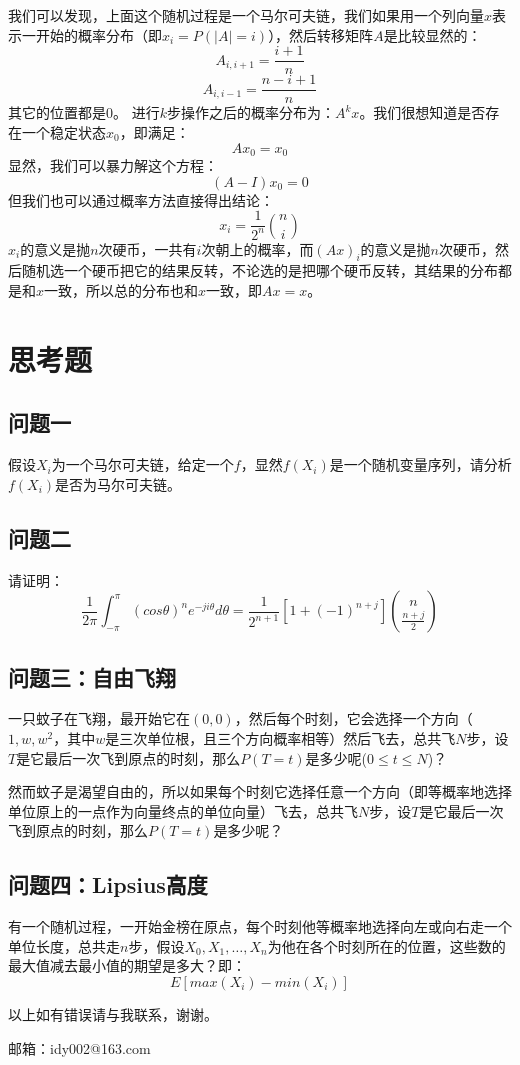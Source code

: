 		我们可以发现，上面这个随机过程是一个马尔可夫链，我们如果用一个列向量$x$表示一开始的概率分布（即$x_i = P(\lvert A\rvert=i)$），然后转移矩阵$A$是比较显然的：
		$$
			A_{i,i+1} = \frac{i+1}{n}
		$$
		$$
			A_{i,i-1} = \frac{n-i+1}{n}
		$$
		其它的位置都是$0$。
		进行$k$步操作之后的概率分布为：$A^kx$。我们很想知道是否存在一个稳定状态$x_0$，即满足：
		$$
			Ax_0 = x_0
		$$
		显然，我们可以暴力解这个方程：
		$$
			(A-I)x_0 = 0
		$$
		但我们也可以通过概率方法直接得出结论：
		$$
			x_i = \frac{1}{2^n} \binom{n}{i}
		$$
		$x_i$的意义是抛$n$次硬币，一共有$i$次朝上的概率，而$(Ax)_i$的意义是抛$n$次硬币，然后随机选一个硬币把它的结果反转，不论选的是把哪个硬币反转，其结果的分布都是和$x$一致，所以总的分布也和$x$一致，即$Ax=x$。
\section{思考题}
	\subsection{问题一}
		假设$X_i$为一个马尔可夫链，给定一个$f$，显然$f(X_i)$是一个随机变量序列，请分析$f(X_i)$是否为马尔可夫链。

	\subsection{问题二}
		请证明：
		$$
		\frac{1}{2\pi}\int_{-\pi}^{\pi}(cos\theta)^ne^{-ji\theta}d\theta = \frac{1}{2^{n+1}}[1+(-1)^{n+j}]\binom{n}{\frac{n+j}{2}}
		$$
	\subsection{问题三：自由飞翔}
		一只蚊子在飞翔，最开始它在$(0,0)$，然后每个时刻，它会选择一个方向（$1,w,w^2$，其中$w$是三次单位根，且三个方向概率相等）然后飞去，总共飞$N$步，设$T$是它最后一次飞到原点的时刻，那么$P(T=t)$是多少呢($0\leq t \leq N$)？
		
		然而蚊子是渴望自由的，所以如果每个时刻它选择任意一个方向（即等概率地选择单位原上的一点作为向量终点的单位向量）飞去，总共飞$N$步，设$T$是它最后一次飞到原点的时刻，那么$P(T=t)$是多少呢？
		
	\subsection{问题四：Lipsius高度}
		有一个随机过程，一开始金榜在原点，每个时刻他等概率地选择向左或向右走一个单位长度，总共走$n$步，假设$X_0, X_1, \dots, X_n$为他在各个时刻所在的位置，这些数的最大值减去最小值的期望是多大？即：
		$$
			E[max(X_i) - min(X_i)]
		$$
	
	\vspace{2cm}
	以上如有错误请与我联系，谢谢。
	
	邮箱：idy002@163.com
　
